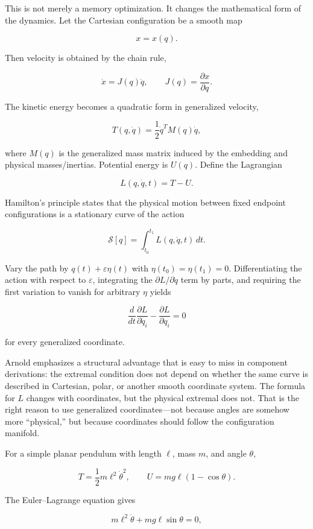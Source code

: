 This is not merely a memory optimization. It changes the mathematical form of the dynamics. Let the Cartesian configuration be a smooth map

\[
x=x(q).
\]

Then velocity is obtained by the chain rule,

\[
\dot x
=
J(q)\dot q,
\qquad
J(q)=\frac{\partial x}{\partial q}.
\]

The kinetic energy becomes a quadratic form in generalized velocity,

\[
T(q,\dot q)
=
\frac12
\dot q^T M(q)\dot q,
\]

where \(M(q)\) is the generalized mass matrix induced by the embedding and physical masses/inertias. Potential energy is \(U(q)\). Define the Lagrangian

\[
L(q,\dot q,t)=T-U.
\]

Hamilton's principle states that the physical motion between fixed endpoint configurations is a stationary curve of the action

\[
\mathcal S[q]
=
\int_{t_0}^{t_1}
L(q,\dot q,t)\,dt.
\]

Vary the path by \(q(t)+\varepsilon\eta(t)\) with \(\eta(t_0)=\eta(t_1)=0\). Differentiating the action with respect to \(\varepsilon\), integrating the \(\partial L/\partial\dot q\) term by parts, and requiring the first variation to vanish for arbitrary \(\eta\) yields

\[
\boxed{
\frac{d}{dt}
\frac{\partial L}{\partial\dot q_i}
-
\frac{\partial L}{\partial q_i}
=
0
}
\]

for every generalized coordinate.

Arnold emphasizes a structural advantage that is easy to miss in component derivations: the extremal condition does not depend on whether the same curve is described in Cartesian, polar, or another smooth coordinate system. The formula for \(L\) changes with coordinates, but the physical extremal does not. That is the right reason to use generalized coordinates---not because angles are somehow more ``physical,'' but because coordinates should follow the configuration manifold.

For a simple planar pendulum with length \(\ell\), mass \(m\), and angle \(\theta\),

\[
T=\frac12m\ell^2\dot\theta^2,
\qquad
U=mg\ell(1-\cos\theta).
\]

The Euler--Lagrange equation gives

\[
m\ell^2\ddot\theta
+
mg\ell\sin\theta
=
0,
\]

